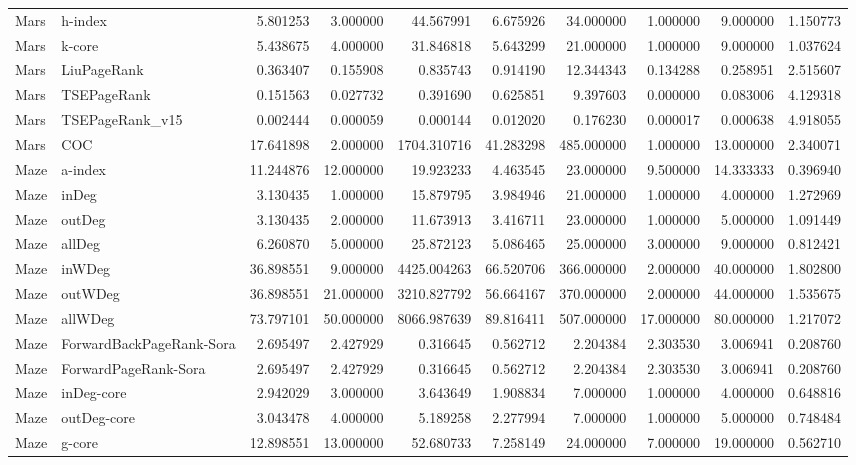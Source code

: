 \begin{tabular}{llrrrrrrrr}
Mars & h-index & 5.801253 & 3.000000 & 44.567991 & 6.675926 & 34.000000 & 1.000000 & 9.000000 & 1.150773 \\
Mars & k-core & 5.438675 & 4.000000 & 31.846818 & 5.643299 & 21.000000 & 1.000000 & 9.000000 & 1.037624 \\
Mars & LiuPageRank & 0.363407 & 0.155908 & 0.835743 & 0.914190 & 12.344343 & 0.134288 & 0.258951 & 2.515607 \\
Mars & TSEPageRank & 0.151563 & 0.027732 & 0.391690 & 0.625851 & 9.397603 & 0.000000 & 0.083006 & 4.129318 \\
Mars & TSEPageRank_v15 & 0.002444 & 0.000059 & 0.000144 & 0.012020 & 0.176230 & 0.000017 & 0.000638 & 4.918055 \\
Mars & COC & 17.641898 & 2.000000 & 1704.310716 & 41.283298 & 485.000000 & 1.000000 & 13.000000 & 2.340071 \\
Maze & a-index & 11.244876 & 12.000000 & 19.923233 & 4.463545 & 23.000000 & 9.500000 & 14.333333 & 0.396940 \\
Maze & inDeg & 3.130435 & 1.000000 & 15.879795 & 3.984946 & 21.000000 & 1.000000 & 4.000000 & 1.272969 \\
Maze & outDeg & 3.130435 & 2.000000 & 11.673913 & 3.416711 & 23.000000 & 1.000000 & 5.000000 & 1.091449 \\
Maze & allDeg & 6.260870 & 5.000000 & 25.872123 & 5.086465 & 25.000000 & 3.000000 & 9.000000 & 0.812421 \\
Maze & inWDeg & 36.898551 & 9.000000 & 4425.004263 & 66.520706 & 366.000000 & 2.000000 & 40.000000 & 1.802800 \\
Maze & outWDeg & 36.898551 & 21.000000 & 3210.827792 & 56.664167 & 370.000000 & 2.000000 & 44.000000 & 1.535675 \\
Maze & allWDeg & 73.797101 & 50.000000 & 8066.987639 & 89.816411 & 507.000000 & 17.000000 & 80.000000 & 1.217072 \\
Maze & ForwardBackPageRank-Sora & 2.695497 & 2.427929 & 0.316645 & 0.562712 & 2.204384 & 2.303530 & 3.006941 & 0.208760 \\
Maze & ForwardPageRank-Sora & 2.695497 & 2.427929 & 0.316645 & 0.562712 & 2.204384 & 2.303530 & 3.006941 & 0.208760 \\
Maze & inDeg-core & 2.942029 & 3.000000 & 3.643649 & 1.908834 & 7.000000 & 1.000000 & 4.000000 & 0.648816 \\
Maze & outDeg-core & 3.043478 & 4.000000 & 5.189258 & 2.277994 & 7.000000 & 1.000000 & 5.000000 & 0.748484 \\
Maze & g-core & 12.898551 & 13.000000 & 52.680733 & 7.258149 & 24.000000 & 7.000000 & 19.000000 & 0.562710 \\

\end{tabular}
